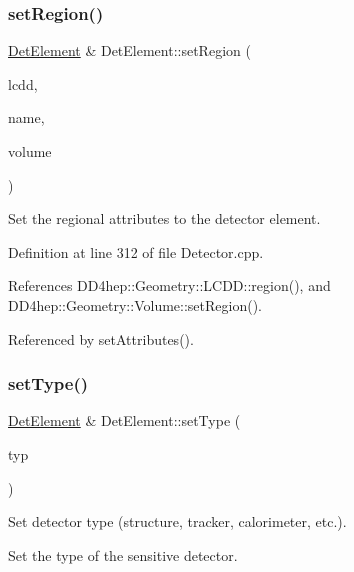 \subsubsection{\texorpdfstring{set\+Region()}{setRegion()}}
{\footnotesize\ttfamily \hyperlink{class_d_d4hep_1_1_geometry_1_1_det_element}{Det\+Element} \& Det\+Element\+::set\+Region (\begin{DoxyParamCaption}\item[{const \hyperlink{class_d_d4hep_1_1_geometry_1_1_l_c_d_d}{L\+C\+DD} \&}]{lcdd,  }\item[{const std\+::string \&}]{name,  }\item[{const \hyperlink{class_d_d4hep_1_1_geometry_1_1_volume}{Volume} \&}]{volume }\end{DoxyParamCaption})}



Set the regional attributes to the detector element. 



Definition at line 312 of file Detector.\+cpp.



References D\+D4hep\+::\+Geometry\+::\+L\+C\+D\+D\+::region(), and D\+D4hep\+::\+Geometry\+::\+Volume\+::set\+Region().



Referenced by set\+Attributes().

\hypertarget{class_d_d4hep_1_1_geometry_1_1_det_element_a10b1fb8bbd6d21d75c421e658e59e0d8}{}\label{class_d_d4hep_1_1_geometry_1_1_det_element_a10b1fb8bbd6d21d75c421e658e59e0d8} 
\subsubsection{\texorpdfstring{set\+Type()}{setType()}}
{\footnotesize\ttfamily \hyperlink{class_d_d4hep_1_1_geometry_1_1_det_element}{Det\+Element} \& Det\+Element\+::set\+Type (\begin{DoxyParamCaption}\item[{const std\+::string \&}]{typ }\end{DoxyParamCaption})}



Set detector type (structure, tracker, calorimeter, etc.). 

Set the type of the sensitive detector. 


